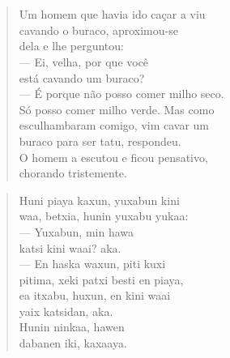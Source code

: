 \chapter*{}

\mbox{}\vspace*{\fill}

\begin{verse}
Um homem que havia ido caçar a viu\\
cavando o buraco, aproximou-se\\
dela e lhe perguntou:\\
— Ei, velha, por que você\\
está cavando um buraco?\\
— É porque não posso comer milho seco.\\
Só posso comer milho verde. Mas como\\
esculhambaram comigo, vim cavar um\\
buraco para ser tatu, respondeu.\\
O homem a escutou e ficou pensativo,\\
chorando tristemente.
\end{verse}

\begin{verse}
Huni piaya kaxun, yuxabun kini\\
waa, betxia, hunin yuxabu yukaa:\\
— Yuxabun, min hawa\\
katsi kini waai? aka.\\
— En haska waxun, piti kuxi\\
pitima, xeki patxi besti en piaya,\\
ea itxabu, huxun, en kini waai\\
yaix katsidan, aka.\\
Hunin ninkaa, hawen\\
dabanen iki, kaxaaya.
\end{verse}

\vspace*{\fill}

